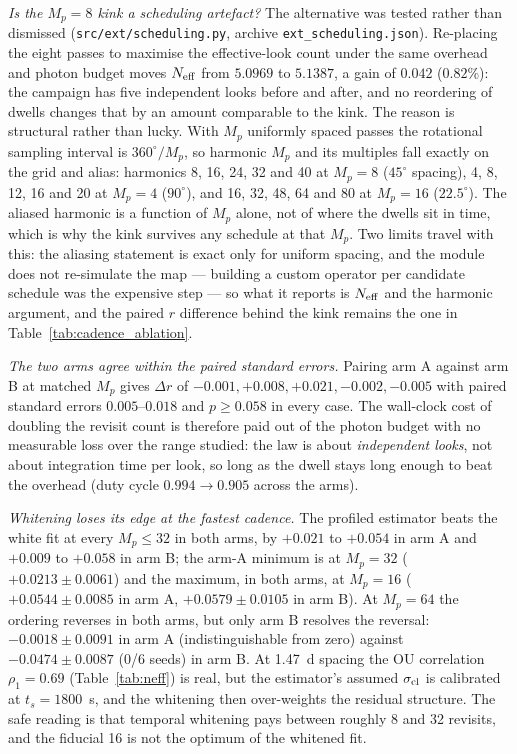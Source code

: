 \documentclass[twocolumn,10pt]{article}
\begin{document}
\emph{Is the $M_p=8$ kink a scheduling artefact?} The alternative was tested
rather than dismissed ({\tt src/ext/scheduling.py}, archive
{\tt ext\_scheduling.json}). Re-placing the eight passes to maximise the
effective-look count under the same overhead and photon budget moves $N_{\rm
eff}$ from $5.0969$ to $5.1387$, a gain of $0.042$ ($0.82\%$): the campaign has
five independent looks before and after, and no reordering of dwells changes
that by an amount comparable to the kink. The reason is structural rather than
lucky. With $M_p$ uniformly spaced passes the rotational sampling interval is
$360^\circ/M_p$, so harmonic $M_p$ and its multiples fall exactly on the grid
and alias: harmonics 8, 16, 24, 32 and 40 at $M_p=8$ ($45^\circ$ spacing), 4,
8, 12, 16 and 20 at $M_p=4$ ($90^\circ$), and 16, 32, 48, 64 and 80 at $M_p=16$
($22.5^\circ$). The aliased harmonic is a function of $M_p$ alone, not of where
the dwells sit in time, which is why the kink survives any schedule at that
$M_p$. Two limits travel with this: the aliasing statement is exact only for
uniform spacing, and the module does not re-simulate the map --- building a
custom operator per candidate schedule was the expensive step --- so what it
reports is $N_{\rm eff}$ and the harmonic argument, and the paired $r$ difference
behind the kink remains the one in Table~\ref{tab:cadence_ablation}.

\emph{The two arms agree within the paired standard errors.} Pairing arm A
against arm B at matched $M_p$ gives $\Delta r$ of $-0.001,+0.008,+0.021,
-0.002,-0.005$ with paired standard errors $0.005$--$0.018$ and $p\ge0.058$ in
every case. The wall-clock cost of doubling the revisit count is therefore paid
out of the photon budget with no measurable loss over the range studied: the
law is about \emph{independent looks}, not about integration time per look, so
long as the dwell stays long enough to beat the overhead (duty cycle
$0.994\to0.905$ across the arms).

\emph{Whitening loses its edge at the fastest cadence.} The profiled
estimator beats the white fit at every $M_p\le32$ in both arms, by $+0.021$ to
$+0.054$ in arm A and $+0.009$ to $+0.058$ in arm B; the arm-A minimum is at
$M_p=32$ ($+0.0213\pm0.0061$) and the maximum, in both arms, at $M_p=16$
($+0.0544\pm0.0085$ in arm A, $+0.0579\pm0.0105$ in arm B). At
$M_p=64$ the ordering reverses in both arms, but only arm B resolves the
reversal: $-0.0018\pm0.0091$ in arm A (indistinguishable from zero)
against $-0.0474\pm0.0087$ (0/6 seeds) in arm B. At 1.47~d spacing the OU correlation
$\rho_1=0.69$ (Table~\ref{tab:neff}) is real, but the estimator's assumed
$\sigma_{\rm cl}$ is calibrated at $t_s=1800$~s, and the whitening then
over-weights the residual structure. The safe reading is that temporal
whitening pays between roughly 8 and 32 revisits, and the fiducial 16 is not
the optimum of the whitened fit.
\end{document}
